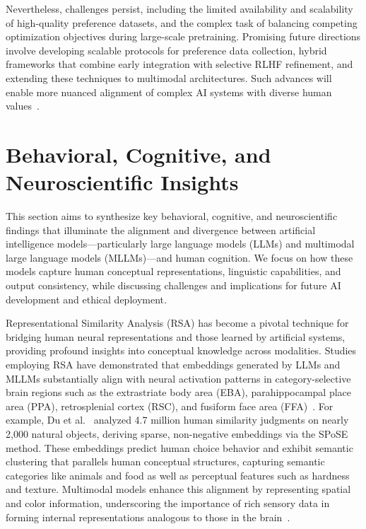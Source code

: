 \documentclass[sigconf]{acmart}
\begin{document}
Nevertheless, challenges persist, including the limited availability and scalability of high-quality preference datasets, and the complex task of balancing competing optimization objectives during large-scale pretraining. Promising future directions involve developing scalable protocols for preference data collection, hybrid frameworks that combine early integration with selective RLHF refinement, and extending these techniques to multimodal architectures. Such advances will enable more nuanced alignment of complex AI systems with diverse human values~\cite{ref41}.

\section{Behavioral, Cognitive, and Neuroscientific Insights}

This section aims to synthesize key behavioral, cognitive, and neuroscientific findings that illuminate the alignment and divergence between artificial intelligence models—particularly large language models (LLMs) and multimodal large language models (MLLMs)—and human cognition. We focus on how these models capture human conceptual representations, linguistic capabilities, and output consistency, while discussing challenges and implications for future AI development and ethical deployment.

Representational Similarity Analysis (RSA) has become a pivotal technique for bridging human neural representations and those learned by artificial systems, providing profound insights into conceptual knowledge across modalities. Studies employing RSA have demonstrated that embeddings generated by LLMs and MLLMs substantially align with neural activation patterns in category-selective brain regions such as the extrastriate body area (EBA), parahippocampal place area (PPA), retrosplenial cortex (RSC), and fusiform face area (FFA)~\cite{ref1,ref2}. For example, Du et al.~\cite{ref1} analyzed 4.7 million human similarity judgments on nearly 2,000 natural objects, deriving sparse, non-negative embeddings via the SPoSE method. These embeddings predict human choice behavior and exhibit semantic clustering that parallels human conceptual structures, capturing semantic categories like animals and food as well as perceptual features such as hardness and texture. Multimodal models enhance this alignment by representing spatial and color information, underscoring the importance of rich sensory data in forming internal representations analogous to those in the brain~\cite{ref2}.
\end{document}
